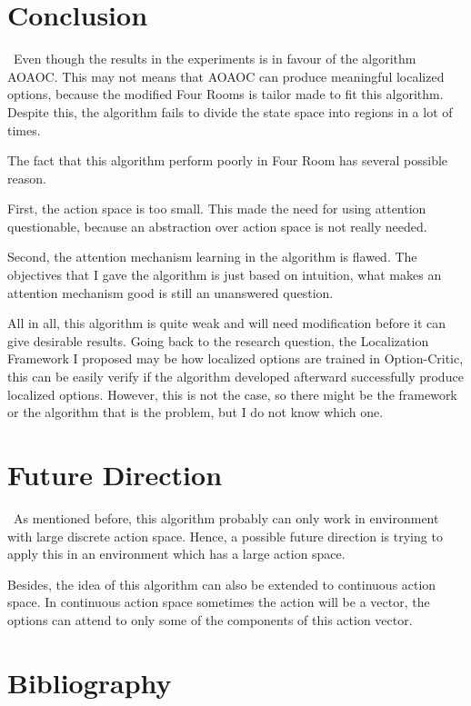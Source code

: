 \documentclass{article}
\begin{document}
	\section{Conclusion}
	\qquad \ Even though the results in the experiments is in favour of the algorithm AOAOC. This may not means that AOAOC can produce meaningful localized options, because the modified Four Rooms is tailor made to fit this algorithm. Despite this, the algorithm fails to divide the state space into regions in a lot of times.
	
	\quad The fact that this algorithm perform poorly in Four Room has several possible reason.
	
	\quad First, the action space is too small. This made the need for using attention questionable, because an abstraction over action space is not really needed.
	
	\quad Second, the attention mechanism learning in the algorithm is flawed. The objectives that I gave the algorithm is just based on intuition, what makes an attention mechanism good is still an unanswered question.
	
	\quad All in all, this algorithm is quite weak and will need modification before it can give desirable results. Going back to the research question, the Localization Framework I proposed may be how localized options are trained in Option-Critic, this can be easily verify if the algorithm developed afterward successfully produce localized options. However, this is not the case, so there might be the framework or the algorithm that is the problem, but I do not know which one.
	\section{Future Direction}
	\qquad \ As mentioned before, this algorithm probably can only work in environment with large discrete action space. Hence, a possible future direction is trying to apply this in an environment which has a large action space.
	
	\quad Besides, the idea of this algorithm can also be extended to continuous action space. In continuous action space sometimes the action will be a vector, the options can attend to only some of the components of this action vector.
	\section*{Bibliography}
	
	
		
\end{document}
